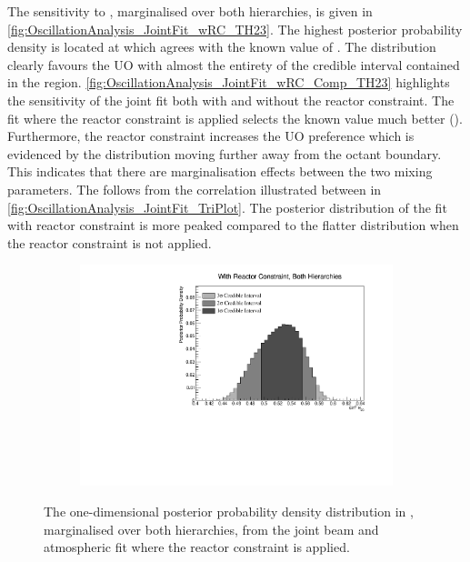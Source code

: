 The sensitivity to , marginalised over both hierarchies, is given in \autoref{fig:OscillationAnalysis_JointFit_wRC_TH23}. The highest posterior probability density is located at  which agrees with the known value of . The distribution clearly favours the UO with almost the entirety of the \quickmath{1\sigma} credible interval contained in the region. \autoref{fig:OscillationAnalysis_JointFit_wRC_Comp_TH23} highlights the sensitivity of the joint fit both with and without the reactor constraint. The fit where the reactor constraint is applied selects the known value much better (). Furthermore, the reactor constraint increases the UO preference which is evidenced by the distribution moving further away from the octant boundary. This indicates that there are marginalisation effects between the two mixing parameters. The follows from the correlation illustrated between  in \autoref{fig:OscillationAnalysis_JointFit_TriPlot}. The posterior distribution of the fit with reactor constraint is more peaked compared to the flatter distribution when the reactor constraint is not applied. 

\begin{figure}[h]
  \begin{subfigure}[t]{0.98\textwidth}
    \includegraphics[width=\textwidth, trim={0mm 0mm 0mm 0mm}, clip,page=1]{Figures/OA/JointFit_wRC/Contours_1D_th23_BH_1_wRC_UnSmeared_CredibleInterval.pdf}
  \end{subfigure}
  \caption{The one-dimensional posterior probability density distribution in , marginalised over both hierarchies, from the joint beam and atmospheric fit where the reactor constraint is applied.}
  \label{fig:OscillationAnalysis_JointFit_wRC_TH23}
\end{figure}

